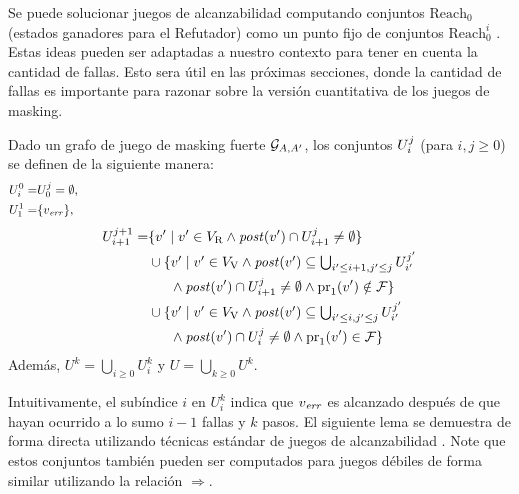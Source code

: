 Se puede solucionar juegos de alcanzabilidad computando conjuntos $\text{Reach}_0$ (estados ganadores para el Refutador) como un punto fijo de conjuntos $\text{Reach}^i_0$  \cite{Jurd11}.
Estas ideas pueden ser adaptadas a nuestro contexto para tener en cuenta la cantidad de fallas. Esto sera útil en las próximas secciones, donde la cantidad de fallas es importante para razonar sobre la versión cuantitativa de los juegos de masking.
\begin{definition}\label{def:U} Dado un grafo de juego de masking fuerte $\mathcal{G}_{A, A'}$, 
los conjuntos $U^j_i$ (para $i,j \geq 0$) se definen de la siguiente manera:
\begin{align*}
  U^0_i =& U^j_0 = \emptyset,  \label{def:of:Uji} \\
  U_1^1 =&  \{\ErrorSt\},
  \hspace{12.5cm} {}\notag
\end{align*}
\begin{align*}
  U_{i+1}^{j+1} =&
    \{v' \mid v' \in V_{\mathrm{R}} \wedge \mathit{post}(v') \cap U_{i+1}^j \neq \emptyset\} \\
    &\textstyle\cup
    \{v' \mid v' \in V_{\mathrm{V}} \wedge \mathit{post}(v') \subseteq \bigcup_{i'\leq i+1, j' \leq j}U_{i'}^{j'} \\
    &\phantom{==}\wedge \mathit{post}(v') \cap U^j_{i+1} \neq \emptyset \wedge \operatorname{pr}_{1}(v') \notin \mathcal{F} \} \\
    &\textstyle \cup
    \{v' \mid  v' \in V_{\mathrm{V}} \wedge \mathit{post}(v') \subseteq \bigcup_{i'\leq i, j' \leq j}U_{i'}^{j'} \\
    &\phantom{==}\wedge \mathit{post}(v') \cap U^j_i \neq \emptyset \wedge \operatorname{pr}_{1}(v') \in \mathcal{F} \}
\end{align*}
Además, $U^k = \bigcup_{i \geq 0} U_i^k$ y $U = \bigcup_{k \geq 0} U^k$.
\end{definition}
Intuitivamente, el subíndice $i$ en $U^k_i$ indica que $v_{\mathit{err}}$ es alcanzado después de que hayan ocurrido a lo sumo $i-1$ fallas y $k$ pasos.
El siguiente lema se demuestra de forma directa utilizando técnicas estándar de juegos de alcanzabilidad \cite{AlfaroHK07}.
	Note que estos conjuntos también pueden ser computados para juegos débiles de forma similar utilizando la relación $\Rightarrow$.
